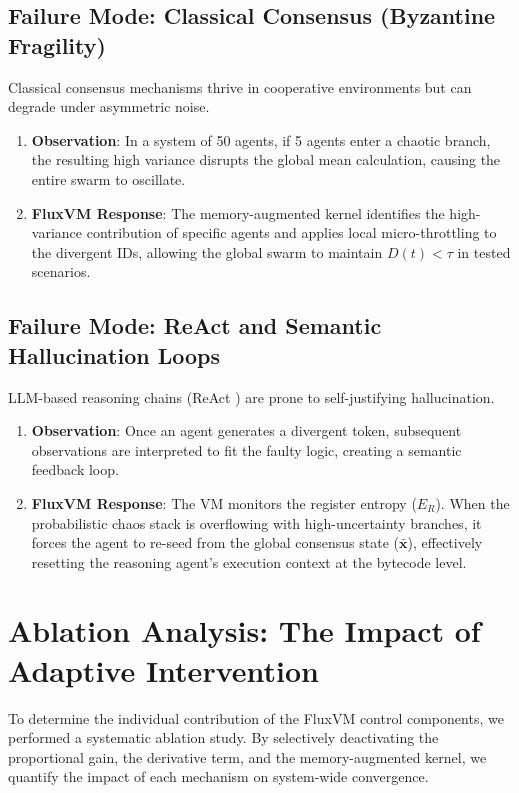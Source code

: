 \documentclass{article}
\begin{document}
\subsection{Failure Mode: Classical Consensus (Byzantine Fragility)}
Classical consensus mechanisms \cite{olfati2007consensus} thrive in cooperative environments but can degrade under asymmetric noise.
\begin{enumerate}
    \item \textbf{Observation}: In a system of 50 agents, if 5 agents enter a chaotic branch, the resulting high variance disrupts the global mean calculation, causing the entire swarm to oscillate.
    \item \textbf{FluxVM Response}: The memory-augmented kernel identifies the high-variance contribution of specific agents and applies local micro-throttling to the divergent IDs, allowing the global swarm to maintain $D(t) < \tau$ in tested scenarios.
\end{enumerate}

\subsection{Failure Mode: ReAct and Semantic Hallucination Loops}
LLM-based reasoning chains (ReAct \cite{yao2022react}) are prone to self-justifying hallucination.
\begin{enumerate}
    \item \textbf{Observation}: Once an agent generates a divergent token, subsequent observations are interpreted to fit the faulty logic, creating a semantic feedback loop.
    \item \textbf{FluxVM Response}: The VM monitors the register entropy ($E_R$). When the probabilistic chaos stack is overflowing with high-uncertainty branches, it forces the agent to re-seed from the global consensus state ($\bar{\mathbf{x}}$), effectively resetting the reasoning agent's execution context at the bytecode level.
\end{enumerate}

\newpage

\section{Ablation Analysis: The Impact of Adaptive Intervention}
\label{sec:ablation_study}

To determine the individual contribution of the FluxVM control components, we performed a systematic ablation study. By selectively deactivating the proportional gain, the derivative term, and the memory-augmented kernel, we quantify the impact of each mechanism on system-wide convergence.
\end{document}
